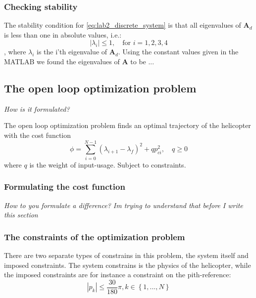 \documentclass[../main.tex]{subfiles}
\begin{document}
\subsubsection{Checking stability}
The stability condition for \cref{eq:lab2_discrete_system} is that all eigenvalues of $ \bm A_d $ is less than one in absolute values, i.e.:
\begin{equation}\label{eq:lab2_stab_condition}
	|\lambda_i| \leq 1, \quad \text{for } i = 1, 2, 3, 4
\end{equation}, where $ \lambda_i $ is the i'th eigenvalue of $ \bm A_d $.
Using the constant values given in the MATLAB we found the eigenvalues of $ \bm A $ to be ... 

\subsection{The open loop optimization problem}
\textit{How is it formulated?}

The open loop optimization problem finds an optimal trajectory of the helicopter with the cost function
\begin{equation}
	\phi = \sum_{i=0}^{N-1} \left( \lambda_{i+1} - \lambda_f \right)^2 + qp_{ci}^2 , \quad q \ge 0
\end{equation}
where $q$ is the weight of input-usage. Subject to constraints.

\subsubsection{Formulating the cost function}
\textit{How to you formulate a difference? Im trying to understand that before I write this section}

\subsubsection{The constraints of the optimization problem}
There are two separate types of constrains in this problem, the system itself and imposed constraints. The system constrains is the physics of the helicopter, while the imposed constraints are for instance a constraint on the pith-reference:
\begin{equation}
	\left\lvert p_k \right\rvert \le \frac{30}{180} \pi, k \in \left\{ 1, ..., N \right\} 
\end{equation}
\end{document}
